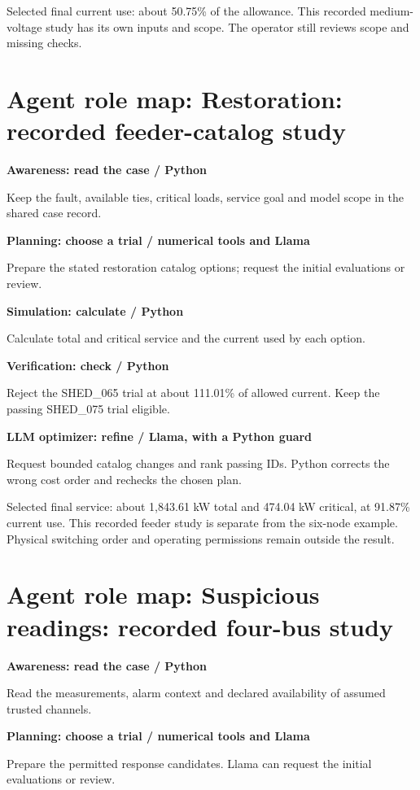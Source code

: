 \documentclass[12pt,letterpaper]{article}
\begin{document}
Selected final current use: about 50.75\% of the allowance. This recorded medium-voltage study has its own inputs and scope. The operator still reviews scope and missing checks.\par
\clearpage\section*{Agent role map: Restoration: recorded feeder-catalog study}
\textbf{Awareness: read the case /\allowbreak{} Python}\par Keep the fault, available ties, critical loads, service goal and model scope in the shared case record.\par\medskip
\textbf{Planning: choose a trial /\allowbreak{} numerical tools and Llama}\par Prepare the stated restoration catalog options; request the initial evaluations or review.\par\medskip
\textbf{Simulation: calculate /\allowbreak{} Python}\par Calculate total and critical service and the current used by each option.\par\medskip
\textbf{Verification: check /\allowbreak{} Python}\par Reject the SHED\_\allowbreak{}065 trial at about 111.01\% of allowed current. Keep the passing SHED\_\allowbreak{}075 trial eligible.\par\medskip
\textbf{LLM optimizer: refine /\allowbreak{} Llama, with a Python guard}\par Request bounded catalog changes and rank passing IDs. Python corrects the wrong cost order and rechecks the chosen plan.\par\medskip
Selected final service: about 1,843.61 kW total and 474.04 kW critical, at 91.87\% current use. This recorded feeder study is separate from the six-node example. Physical switching order and operating permissions remain outside the result.\par
\clearpage\section*{Agent role map: Suspicious readings: recorded four-bus study}
\textbf{Awareness: read the case /\allowbreak{} Python}\par Read the measurements, alarm context and declared availability of assumed trusted channels.\par\medskip
\textbf{Planning: choose a trial /\allowbreak{} numerical tools and Llama}\par Prepare the permitted response candidates. Llama can request the initial evaluations or review.\par\medskip
\end{document}
